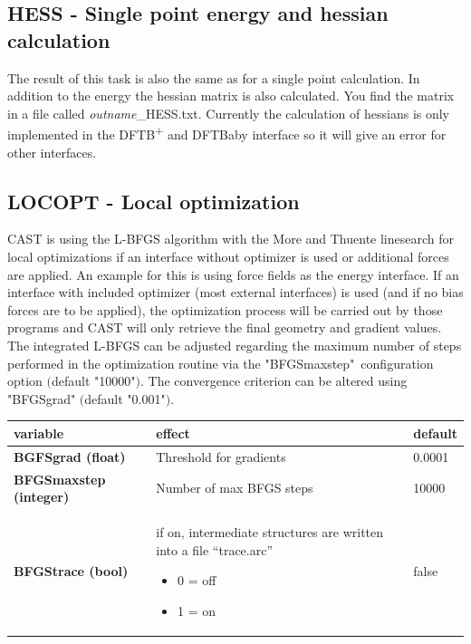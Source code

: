 \documentclass[10pt,a4paper]{article} %
\begin{document}
	\subsection{HESS - Single point energy and hessian calculation}
	The result of this task is also the same as for a single point calculation. In addition to the energy the hessian matrix is also calculated. You find the matrix in a file called \textit{outname}\_HESS.txt. Currently the calculation of hessians is only implemented in the DFTB\textsuperscript{+} and DFTBaby interface so it will give an error for other interfaces.
	

	\subsection{LOCOPT - Local optimization}
	\label{sec:locopt}
	\ac{CAST} is using the L-BFGS algorithm\supercite{bfgs} with the More and Thuente linesearch\supercite{morethuente} for local optimizations if an interface without optimizer is used or additional forces are applied. An example for this is using force fields as the energy interface.  
	If an interface with included optimizer (most external interfaces) is used (and if no bias forces are to be applied), the optimization process will be carried out by those programs and \ac{CAST} will only retrieve the final geometry and gradient values.
	The integrated L-BFGS can be adjusted regarding the maximum number of steps performed in the optimization routine via the "BFGSmaxstep"\ configuration option $($default "10000"$)$.
	The convergence criterion can be altered using "BFGSgrad" $($default "0.001"$)$.

	\begin{longtable}{|p{4cm}|p{5cm}|p{2cm}|}
		variable & effect & default \\
		\hline
		\textbf{BGFSgrad (float)} & Threshold for gradients & 0.0001 \\
		\textbf{BFGSmaxstep (integer)} & Number of max BFGS steps & 10000 \\
		\textbf{BFGStrace (bool)} & if on, intermediate structures are written into a file ``trace.arc'' \begin{itemize} \item 0 = off \item 1 = on\end{itemize} & false \\
	\end{longtable}
\end{document}
